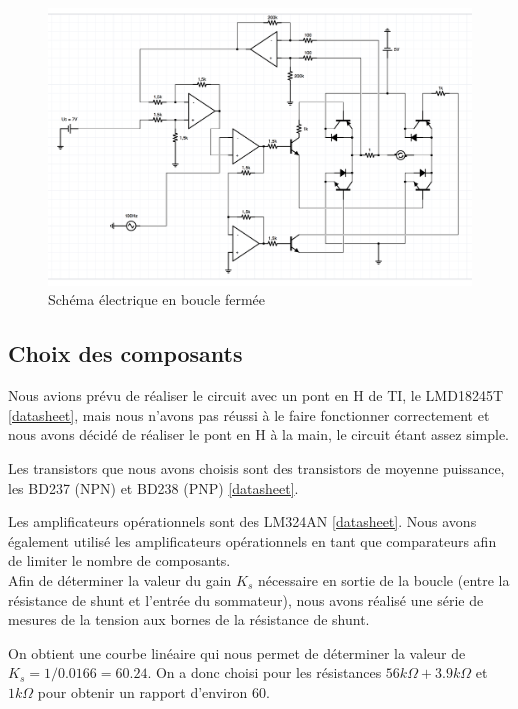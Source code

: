 \documentclass[a4paper]{article}
\begin{document}
\begin{figure}[H]
\centering
	\includegraphics[width=1\textwidth]{schema_boucle.png}
	\caption{Schéma électrique en boucle fermée}
\end{figure}


\subsection{Choix des composants}

Nous avions prévu de réaliser le circuit avec un pont en H de TI, le LMD18245T \href{http://www.ti.com/lit/ds/symlink/lmd18245.pdf}{[datasheet]}, mais nous n'avons pas réussi à le faire fonctionner correctement et nous avons décidé de réaliser le pont en H à la main, le circuit étant assez simple.

Les transistors que nous avons choisis sont des transistors de moyenne puissance, les BD237 (NPN) et BD238 (PNP) \href{http://www.onsemi.com/pub_link/Collateral/BD237-D.PDF}{[datasheet]}.

Les amplificateurs opérationnels sont des LM324AN \href{https://www.fairchildsemi.com/datasheets/LM/LM324.pdf}{[datasheet]}. Nous avons également utilisé les amplificateurs opérationnels en tant que comparateurs afin de limiter le nombre de composants.\\

Afin de déterminer la valeur du gain $K_s$ nécessaire en sortie de la boucle (entre la résistance de shunt et l'entrée du sommateur), nous avons réalisé une série de mesures de la tension aux bornes de la résistance de shunt.

On obtient une courbe linéaire qui nous permet de déterminer la valeur de $K_s = 1/0.0166 = 60.24$. On a donc choisi pour les résistances $56k\Omega + 3.9k\Omega$ et $1k\Omega$ pour obtenir un rapport d'environ 60. 
\end{document}

